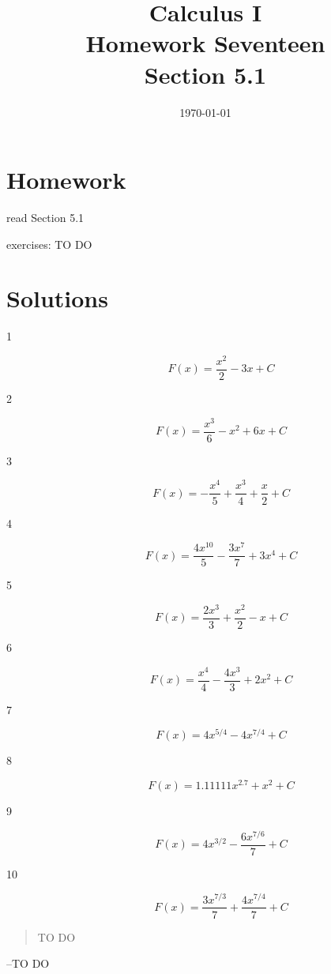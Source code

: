 \documentclass[letterpaper, landscape]{exam}
\title{Calculus I \\ Homework Seventeen \\ Section 5.1}
\author{}
\date{\today}
\begin{document}
  \maketitle

  \section{Homework}
    \begin{itemize*}
      \item read Section 5.1
      \item exercises: TO DO
    \end{itemize*}

    \ifprintanswers{}

  \section{Solutions}

  \begin{description}

    \item[1] 
      \[
        F(x) = \frac{x^2}{2} - 3x + C
      \]

    \item[2] 
      \[
        F(x) = \frac{x^3}{6} - x^2 + 6x + C
      \]

    \item[3] 
      \[
        F(x) = - \frac{x^4}{5} + \frac{x^3}{4} + \frac{x}{2} + C
      \]

    \item[4] 
      \[
        F(x) = \frac{4x^{10}}{5} - \frac{3x^7}{7} + 3x^4 + C
      \]

    \item[5] 
      \[
        F(x) = \frac{2x^3}{3} + \frac{x^2}{2} - x + C
      \]

    \item[6] 
      \[
        F(x) = \frac{x^4}{4} - \frac{4x^3}{3} + 2x^2 + C
      \]

    \item[7] 
      \[
        F(x) = 4x^{5/4} - 4x^{7/4} + C
      \]

    \item[8] 
      \[
        F(x) = 1.11111x^{2.7} + x^2 + C
      \]

    \item[9] 
      \[
        F(x) = 4x^{3/2} - \frac{6x^{7/6}}{7} + C
      \]

    \item[10] 
      \[
        F(x) = \frac{3x^{7/3}}{7} + \frac{4x^{7/4}}{7} + C
      \]

  \end{description}

  \else
    \vspace{9 cm}
    \begin{quote}
      \begin{em}
        TO DO
      \end{em}
    \end{quote}
    \hspace{2 cm} --TO DO
  \fi
\end{document}
